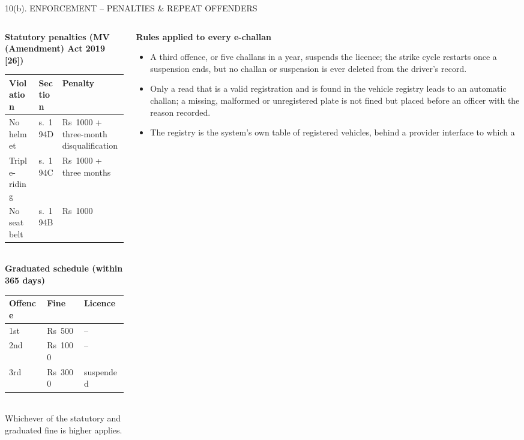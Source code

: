 \documentclass[aspectratio=169,10pt,t]{beamer}
\newcommand{\hd}[1]{{\color{dsblue}\textbf{#1}}}          %
\begin{document}
\begin{frame}{10(b). ENFORCEMENT -- PENALTIES \& REPEAT OFFENDERS}
\begin{columns}[T,onlytextwidth]
\begin{column}{0.44\textwidth}
\hd{\small Statutory penalties (MV (Amendment) Act 2019 [26])}\\[0.2em]
\scriptsize
\begin{tabular}{@{}llp{30mm}@{}}
\toprule
\textbf{Violation} & \textbf{Section} & \textbf{Penalty}\\
\midrule
No helmet & s.~194D & Rs~1000 + three-month disqualification\\
Triple-riding & s.~194C & Rs~1000 + three months\\
No seat belt & s.~194B & Rs~1000\\
\bottomrule
\end{tabular}\\[0.6em]
\hd{\small Graduated schedule (within 365 days)}\\[0.2em]
\begin{tabular}{@{}lll@{}}
\toprule
\textbf{Offence} & \textbf{Fine} & \textbf{Licence}\\
\midrule
1st & Rs~500 & --\\
2nd & Rs~1000 & --\\
3rd & Rs~3000 & suspended\\
\bottomrule
\end{tabular}\\[0.3em]
{\tiny Whichever of the statutory and graduated fine is higher applies.}
\end{column}
\begin{column}{0.53\textwidth}
\hd{\small Rules applied to every e-challan}
\scriptsize
\begin{itemize}\setlength{\itemsep}{0.15em}
  \item A third offence, or five challans in a year, suspends the licence; the strike cycle restarts once a
        suspension ends, but no challan or suspension is ever deleted from the driver's record.
  \item Only a read that is a valid registration and is found in the vehicle registry leads to an automatic
        challan; a missing, malformed or unregistered plate is not fined but placed before an officer with the
        reason recorded.
  \item The registry is the system's own table of registered vehicles, behind a provider interface to which a

\end{itemize}
\end{column}
\end{columns}
\end{frame}
\end{document}
